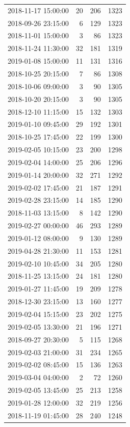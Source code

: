 \begin{tabular}{lrrr}
2018-11-17 15:00:00 & 20 & 206 & 1323 \\
2018-09-26 23:15:00 & 6 & 129 & 1323 \\
2018-11-01 15:00:00 & 3 & 86 & 1323 \\
2018-11-24 11:30:00 & 32 & 181 & 1319 \\
2019-01-08 15:00:00 & 11 & 131 & 1316 \\
2018-10-25 20:15:00 & 7 & 86 & 1308 \\
2018-10-06 09:00:00 & 3 & 90 & 1305 \\
2018-10-20 20:15:00 & 3 & 90 & 1305 \\
2018-12-10 11:15:00 & 15 & 132 & 1303 \\
2019-01-10 09:45:00 & 29 & 192 & 1301 \\
2018-10-25 17:45:00 & 22 & 199 & 1300 \\
2019-02-05 10:15:00 & 23 & 200 & 1298 \\
2019-02-04 14:00:00 & 25 & 206 & 1296 \\
2019-01-14 20:00:00 & 32 & 271 & 1292 \\
2019-02-02 17:45:00 & 21 & 187 & 1291 \\
2019-02-28 23:15:00 & 14 & 185 & 1290 \\
2018-11-03 13:15:00 & 8 & 142 & 1290 \\
2019-02-27 00:00:00 & 46 & 293 & 1289 \\
2019-01-12 08:00:00 & 9 & 130 & 1289 \\
2019-04-28 21:30:00 & 11 & 153 & 1281 \\
2019-02-10 10:45:00 & 34 & 205 & 1280 \\
2018-11-25 13:15:00 & 24 & 181 & 1280 \\
2019-01-27 11:45:00 & 19 & 209 & 1278 \\
2018-12-30 23:15:00 & 13 & 160 & 1277 \\
2019-02-04 15:15:00 & 23 & 202 & 1275 \\
2019-02-05 13:30:00 & 21 & 196 & 1271 \\
2018-09-27 20:30:00 & 5 & 115 & 1268 \\
2019-02-03 21:00:00 & 31 & 234 & 1265 \\
2019-02-02 08:45:00 & 15 & 136 & 1263 \\
2019-03-04 04:00:00 & 2 & 72 & 1260 \\
2019-02-05 13:45:00 & 25 & 213 & 1258 \\
2019-01-28 12:00:00 & 32 & 219 & 1256 \\
2018-11-19 01:45:00 & 28 & 240 & 1248 \\

\end{tabular}
